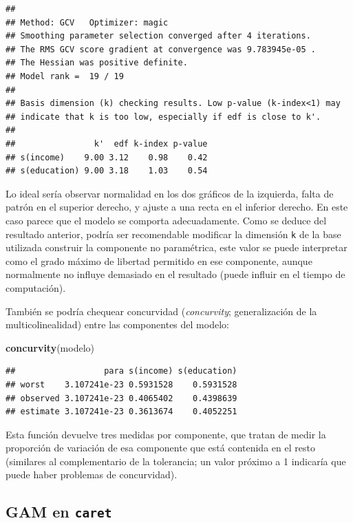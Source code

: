 \documentclass[
]{book}
\newenvironment{Shaded}{\begin{snugshade}}{\end{snugshade}}
\newcommand{\KeywordTok}[1]{\textcolor[rgb]{0.13,0.29,0.53}{\textbf{#1}}}
\newcommand{\NormalTok}[1]{#1}
\theoremstyle{break}
\theoremstyle{definition}
\theoremstyle{definition}
\theoremstyle{definition}
\theoremstyle{remark}
\begin{document}
\begin{verbatim}
## 
## Method: GCV   Optimizer: magic
## Smoothing parameter selection converged after 4 iterations.
## The RMS GCV score gradient at convergence was 9.783945e-05 .
## The Hessian was positive definite.
## Model rank =  19 / 19 
## 
## Basis dimension (k) checking results. Low p-value (k-index<1) may
## indicate that k is too low, especially if edf is close to k'.
## 
##                k'  edf k-index p-value
## s(income)    9.00 3.12    0.98    0.42
## s(education) 9.00 3.18    1.03    0.54
\end{verbatim}

Lo ideal sería observar normalidad en los dos gráficos de la izquierda, falta de patrón en el superior derecho, y ajuste a una recta en el inferior derecho. En este caso parece que el modelo se comporta adecuadamente.
Como se deduce del resultado anterior, podría ser recomendable modificar la dimensión \texttt{k} de la base utilizada construir la componente no paramétrica, este valor se puede interpretar como el grado máximo de libertad permitido en ese componente, aunque normalmente no influye demasiado en el resultado (puede influir en el tiempo de computación).

También se podría chequear concurvidad (\emph{concurvity}; generalización de la multicolinealidad) entre las componentes del modelo:

\begin{Shaded}
\begin{Highlighting}[]
\KeywordTok{concurvity}\NormalTok{(modelo)}
\end{Highlighting}
\end{Shaded}

\begin{verbatim}
##                  para s(income) s(education)
## worst    3.107241e-23 0.5931528    0.5931528
## observed 3.107241e-23 0.4065402    0.4398639
## estimate 3.107241e-23 0.3613674    0.4052251
\end{verbatim}

Esta función devuelve tres medidas por componente, que tratan de medir la proporción de variación de esa componente que está contenida en el resto (similares al complementario de la tolerancia; un valor próximo a 1 indicaría que puede haber problemas de concurvidad).

\hypertarget{gam-en-caret}{%
\subsection{\texorpdfstring{GAM en \texttt{caret}}{GAM en caret}}\label{gam-en-caret}}
\end{document}
